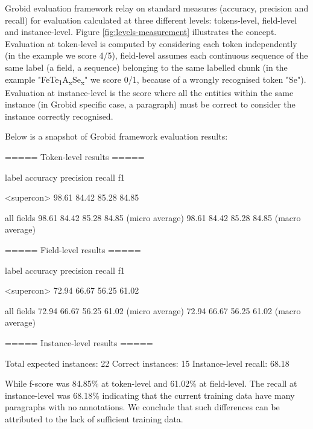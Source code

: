 \documentclass{article}[a4]
\begin{document}
Grobid evaluation framework relay on standard measures (accuracy, precision and recall) for evaluation calculated at three different levels: tokens-level, field-level and instance-level. Figure \ref{fig:levels-measurement} illustrates the concept. 
Evaluation at token-level is computed by considering each token independently (in the example we score 4/5), field-level assumes each continuous sequence of the same label (a field, a sequence) belonging to the same labelled chunk (in the example  "FeTe\textsubscript{1}A\textsubscript{x}Se\textsubscript{x}" we score 0/1, because of a wrongly recognised token "Se"). Evaluation at instance-level is the score where all the entities within the same instance (in Grobid specific case, a paragraph) must be correct to consider the instance correctly recognised. 

Below is a snapshot of Grobid framework evaluation results: 

\begin{verbnobox}[\small]
===== Token-level results =====

label                accuracy     precision    recall       f1     

<supercon>           98.61        84.42        85.28        84.85  

all fields           98.61        84.42        85.28        84.85   (micro average)
                     98.61        84.42        85.28        84.85   (macro average)

===== Field-level results =====

label                accuracy     precision    recall       f1     

<supercon>           72.94        66.67        56.25        61.02  

all fields           72.94        66.67        56.25        61.02   (micro average)
                     72.94        66.67        56.25        61.02   (macro average)

===== Instance-level results =====

Total expected instances:   22
Correct instances:          15
Instance-level recall:      68.18
\end{verbnobox}

While f-score was 84.85\% at token-level and 61.02\% at field-level. 
The recall at instance-level was 68.18\% indicating that the current training data have many paragraphs with no annotations. We conclude that such differences can be attributed to the lack of sufficient training data. 
\end{document}
